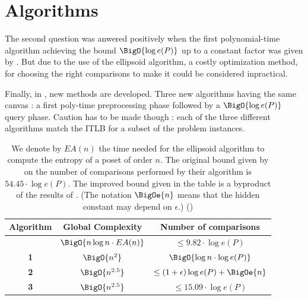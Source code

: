 


\section{Algorithms}


The second question was anwered positively when the first polynomial-time algorithm achieving the bound $\BigO{\log e(P)}$ up to a constant factor was given by \cite{kahnkim1}. But due to the use of the ellipsoid algorithm, a costly optimization method, for choosing the right comparisons to make it could be considered inpractical.

Finally, in \cite{cardinal2013sorting}, new methods are developed. Three new algorithms having the same canvas : a first poly-time preprocessing phase followed by a $\BigO{\log e(P)}$ query phase. Caution has to be made though : each of the three different algorithms match the ITLB for a subset of the problem instances.

\begin{table}
	\begin{center}
	\caption{We denote by $E A(n)$ the time needed for the ellipsoid algorithm to compute the entropy of a poset of order $n$. The original bound given by \cite{kahnkim1} on the number of comparisons performed by their algorithm is $54.45 \cdot \log e(P)$. The improved bound given in the table is a byproduct of the results of \cite{cardinal2013sorting}. (The notation $\BigOe{n}$ means that the hidden constant may depend on $\epsilon$.) (\cite{cardinal2013sorting})}
	\label{tree:supi:table/jcardin}
	\begin{tabular}{|c|c|c|}

	\hline
	Algorithm & Global Complexity & Number of comparisons\\\hline\hline
	\cite{kahnkim1} & $\BigO{n \log n \cdot E A(n)}$ & $\leq 9.82 \cdot \log e(P)$\\\hline\hline
	\cite{cardinal2013sorting} \textbf{1} & $ \BigO{n^{2}} $ & $\BigO{\log n \cdot \log e(P)}$ \\\hline
	\cite{cardinal2013sorting} \textbf{2} & $ \BigO{n^{2.5}} $ & $\leq (1 + \epsilon) \log e(P) + \BigOe{n}$ \\\hline
	\cite{cardinal2013sorting} \textbf{3} & $ \BigO{n^{2.5}} $ & $\leq 15.09 \cdot \log e(P)$ \\\hline

	\end{tabular}
	\end{center}
\end{table}


